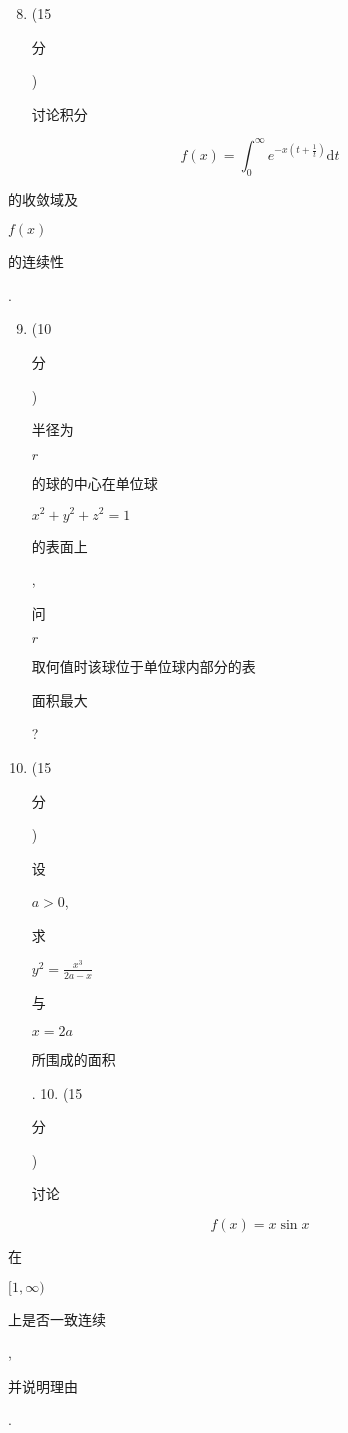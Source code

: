 \documentclass[10pt]{article}
\begin{document}
\begin{enumerate}
  \setcounter{enumi}{7}
  \item (15 \begin{CJK}{UTF8}{mj}分\end{CJK}) \begin{CJK}{UTF8}{mj}讨论积分\end{CJK}
\end{enumerate}
$$
f(x)=\int_{0}^{\infty} e^{-x\left(t+\frac{1}{t}\right)} \mathrm{d} t
$$
\begin{CJK}{UTF8}{mj}的收敛域及\end{CJK} $f(x)$ \begin{CJK}{UTF8}{mj}的连续性\end{CJK}.

\begin{enumerate}
  \setcounter{enumi}{8}
  \item (10 \begin{CJK}{UTF8}{mj}分\end{CJK}) \begin{CJK}{UTF8}{mj}半径为\end{CJK} $r$ \begin{CJK}{UTF8}{mj}的球的中心在单位球\end{CJK} $x^{2}+y^{2}+z^{2}=1$ \begin{CJK}{UTF8}{mj}的表面上\end{CJK}, \begin{CJK}{UTF8}{mj}问\end{CJK} $r$ \begin{CJK}{UTF8}{mj}取何值时该球位于单位球内部分的表\end{CJK} \begin{CJK}{UTF8}{mj}面积最大\end{CJK}?

  \item (15 \begin{CJK}{UTF8}{mj}分\end{CJK}) \begin{CJK}{UTF8}{mj}设\end{CJK} $a>0$, \begin{CJK}{UTF8}{mj}求\end{CJK} $y^{2}=\frac{x^{3}}{2 a-x}$ \begin{CJK}{UTF8}{mj}与\end{CJK} $x=2 a$ \begin{CJK}{UTF8}{mj}所围成的面积\end{CJK}. 10. (15 \begin{CJK}{UTF8}{mj}分\end{CJK}) \begin{CJK}{UTF8}{mj}讨论\end{CJK}

\end{enumerate}
$$
f(x)=x \sin x
$$
\begin{CJK}{UTF8}{mj}在\end{CJK} $[1, \infty)$ \begin{CJK}{UTF8}{mj}上是否一致连续\end{CJK}, \begin{CJK}{UTF8}{mj}并说明理由\end{CJK}.
\end{document}
